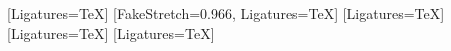   {\newfontfamily{}[Ligatures=TeX]}
  {\newfontfamily{}[FakeStretch=0.966, Ligatures=TeX]}
\newfontfamily{}[Ligatures=TeX]
\newfontfamily{}[Ligatures=TeX]
\newfontfamily{}[Ligatures=TeX]
\newfontfamily{}
\setmonofont{Liberation Mono}
\def\pptxbase{apt}
\def\pptxtitlef{apt}
\def\pptxtitlex{68.12}
\def\pptxtitley{84.48}
\def\pptxtitles{34}

